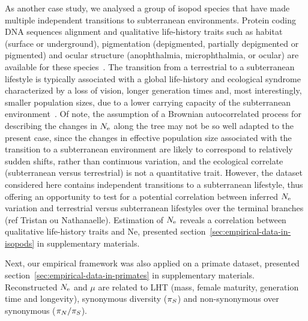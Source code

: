 As another case study, we analysed a group of isopod species that have made multiple independent transitions to subterranean environments.
Protein coding DNA sequences alignment and qualitative life-history traits such as habitat (surface or underground), pigmentation (depigmented, partially depigmented or pigmented) and ocular structure (anophthalmia, microphthalmia, or ocular) are available for these species~\citep{Eme2013,Saclier2018}.
The transition from a terrestrial to a subterranean lifestyle is typically associated with a global life-history and ecological syndrome characterized by a loss of vision, longer generation times and, most interestingly, smaller population sizes, due to a lower carrying capacity of the subterranean environment~\citep{Capderrey2013}.
Of note, the assumption of a Brownian autocorrelated process for describing the changes in $N_{\text{e}}$ along the tree may not be so well adapted to the present case, since the changes in effective population size associated with the transition to a subterranean environment are likely to correspond to relatively sudden shifts, rather than continuous variation, and the ecological correlate (subterranean versus terrestrial) is not a quantitative trait.
However, the dataset considered here contains independent transitions to a subterranean lifestyle, thus offering an opportunity to test for a potential correlation between inferred $N_{\text{e}}$ variation and terrestrial versus subterranean lifestyles over the terminal branches (ref Tristan ou Nathanaelle).
Estimation of $N_{\text{e}}$ reveals a correlation between qualitative life-history traits and Ne, presented section~\ref{sec:empirical-data-in-isopods} in supplementary materials.

Next, our empirical framework was also applied on a primate dataset, presented section~\ref{sec:empirical-data-in-primates} in supplementary materials.
Reconstructed $N_{\text{e}}$ and $\mu$ are related to LHT (mass, female maturity, generation time and longevity), synonymous diversity ($\pi_S$) and non-synonymous over synonymous ($\pi_N / \pi_S$).


